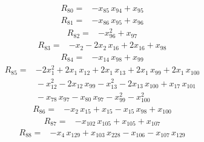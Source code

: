 \documentclass[11pt]{article}
\begin{document}
\begin{equation*}\begin{aligned}
R_{80}={}&-x_{85}\,x_{94} + x_{95}
\end{aligned}\end{equation*}
\begin{equation*}\begin{aligned}
R_{81}={}&-x_{86}\,x_{95} + x_{96}
\end{aligned}\end{equation*}
\begin{equation*}\begin{aligned}
R_{82}={}&-x_{96}^{2} + x_{97}
\end{aligned}\end{equation*}
\begin{equation*}\begin{aligned}
R_{83}={}&-x_{2} - 2x_{2}\,x_{16} + 2x_{16} + x_{98}
\end{aligned}\end{equation*}
\begin{equation*}\begin{aligned}
R_{84}={}&-x_{14}\,x_{98} + x_{99}
\end{aligned}\end{equation*}
\begin{equation*}\begin{aligned}
R_{85}={}&-2x_{1}^{2} + 2x_{1}\,x_{12} + 2x_{1}\,x_{13} + 2x_{1}\,x_{99} + 2x_{1}\,x_{100} \\
&{} - x_{12}^{2} - 2x_{12}\,x_{99} - x_{13}^{2} - 2x_{13}\,x_{100} + x_{17}\,x_{101} \\
&{} - x_{78}\,x_{97} - x_{80}\,x_{97} - x_{99}^{2} - x_{100}^{2}
\end{aligned}\end{equation*}
\begin{equation*}\begin{aligned}
R_{86}={}&-x_{2}\,x_{15} + x_{15} - x_{15}\,x_{98} + x_{100}
\end{aligned}\end{equation*}
\begin{equation*}\begin{aligned}
R_{87}={}&-x_{102}\,x_{105} + x_{105} + x_{107}
\end{aligned}\end{equation*}
\begin{equation*}\begin{aligned}
R_{88}={}&-x_{4}\,x_{129} + x_{103}\,x_{228} - x_{106} - x_{107}\,x_{129}
\end{aligned}\end{equation*}
\end{document}
